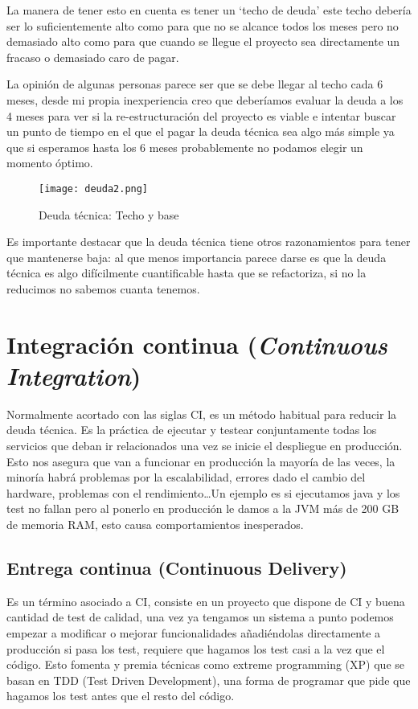 La manera de tener esto en cuenta es tener un `techo de deuda' este techo debería ser lo suficientemente alto como para que no se alcance todos los meses pero no demasiado alto como para que cuando se llegue el proyecto sea directamente un fracaso o demasiado caro de pagar.

La opinión de algunas personas parece ser que se debe llegar al techo cada 6 meses, desde mi propia inexperiencia creo que deberíamos evaluar la deuda a los 4 meses para ver si la re-estructuración del proyecto es viable e intentar buscar un punto de tiempo en el que el pagar la deuda técnica sea algo más simple ya que si esperamos hasta los 6 meses probablemente no podamos elegir un momento óptimo. 

\begin{figure}
	\centering
	\texttt{[image: deuda2.png]}
	\caption{Deuda técnica: Techo y base \cite{kni13}}\label{fig:deuda2.png}
\end{figure}

Es importante destacar que la deuda técnica tiene otros razonamientos para tener que mantenerse baja: al que menos importancia parece darse es que la deuda técnica es algo difícilmente cuantificable hasta que se refactoriza, si no la reducimos no sabemos cuanta tenemos.

\section{Integración continua (\textit{Continuous Integration})}

Normalmente acortado con las siglas CI, es un método habitual para reducir la deuda técnica. Es la práctica de ejecutar y testear conjuntamente todas los servicios que deban ir relacionados una vez se inicie el despliegue en producción. Esto nos asegura que van a funcionar en producción la mayoría de las veces, la minoría habrá problemas por la escalabilidad, errores dado el cambio del hardware, problemas con el rendimiento\ldots Un ejemplo es si ejecutamos java y los test no fallan pero al ponerlo en producción le damos a la JVM más de 200 GB de memoria RAM, esto causa comportamientos inesperados.

\subsection{Entrega continua (Continuous Delivery)}

Es un término asociado a CI, consiste en un proyecto que dispone de CI y buena cantidad de test de calidad, una vez ya tengamos un sistema a punto podemos empezar a modificar o mejorar funcionalidades añadiéndolas directamente a producción si pasa los test, requiere que hagamos los test casi a la vez que el código. Esto fomenta y premia técnicas como extreme programming (XP) que se basan en TDD (Test Driven Development), una forma de programar que pide que hagamos los test antes que el resto del código.


